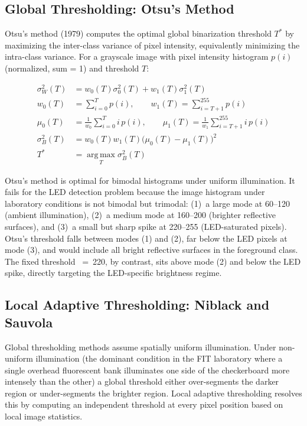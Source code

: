 \subsection{Global Thresholding: Otsu's Method}

Otsu's method (1979) computes the optimal global binarization threshold $T^*$ by maximizing the inter-class variance of pixel intensity, equivalently minimizing the intra-class variance. For a grayscale image with pixel intensity histogram $p(i)$ (normalized, sum = 1) and threshold $T$:

\begin{eqblock}
\begin{align}
\sigma_W^2(T) &= w_0(T)\sigma_0^2(T) + w_1(T)\sigma_1^2(T) \\
w_0(T) &= \sum_{i=0}^{T} p(i), \qquad w_1(T) = \sum_{i=T+1}^{255} p(i) \\
\mu_0(T) &= \frac{1}{w_0}\sum_{i=0}^{T} i\,p(i), \qquad \mu_1(T) = \frac{1}{w_1}\sum_{i=T+1}^{255} i\,p(i) \\
\sigma_B^2(T) &= w_0(T)w_1(T)\big(\mu_0(T)-\mu_1(T)\big)^2 \\
T^* &= \operatorname*{arg\,max}_T \sigma_B^2(T)
\end{align}
\end{eqblock}

Otsu's method is optimal for bimodal histograms under uniform illumination. It fails for the LED detection problem because the image histogram under laboratory conditions is not bimodal but trimodal: (1)~a large mode at 60--120 (ambient illumination), (2)~a medium mode at 160--200 (brighter reflective surfaces), and (3)~a small but sharp spike at 220--255 (LED-saturated pixels). Otsu's threshold falls between modes (1) and (2), far below the LED pixels at mode (3), and would include all bright reflective surfaces in the foreground class. The fixed threshold ~=~220, by contrast, sits above mode (2) and below the LED spike, directly targeting the LED-specific brightness regime.

\subsection{Local Adaptive Thresholding: Niblack and Sauvola}

Global thresholding methods assume spatially uniform illumination. Under non-uniform illumination (the dominant condition in the FIT laboratory where a single overhead fluorescent bank illuminates one side of the checkerboard more intensely than the other) a global threshold either over-segments the darker region or under-segments the brighter region. Local adaptive thresholding resolves this by computing an independent threshold at every pixel position based on local image statistics.

